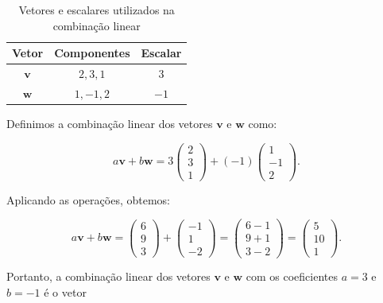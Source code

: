 \begin{table}[h]
	\centering
	\begin{tabular}{@{}ccc@{}}
		\toprule
		\textbf{Vetor} & \textbf{Componentes} & \textbf{Escalar} \\ \midrule
		$\mathbf{v}$   & $ 2, 3, 1$   & $3$              \\
		$\mathbf{w}$   & $ 1, -1, 2$  & $-1$             \\ \bottomrule
	\end{tabular}
	\caption{Vetores e escalares utilizados na combinação linear}
\end{table}

Definimos a combinação linear dos vetores $\mathbf{v}$ e $\mathbf{w}$ como:

\begin{equation}
	a\mathbf{v} + b\mathbf{w} = 3 \begin{pmatrix} 2 \\ 3 \\ 1 \end{pmatrix} + (-1) \begin{pmatrix} 1 \\ -1 \\ 2 \end{pmatrix}.
\end{equation}

Aplicando as operações, obtemos:

\begin{equation}
	a\mathbf{v} + b\mathbf{w} = \begin{pmatrix} 6 \\ 9 \\ 3 \end{pmatrix} + \begin{pmatrix} -1 \\ 1 \\ -2 \end{pmatrix} = \begin{pmatrix} 6 - 1 \\ 9 + 1 \\ 3 - 2 \end{pmatrix} = \begin{pmatrix} 5 \\ 10 \\ 1 \end{pmatrix}.
\end{equation}

Portanto, a combinação linear dos vetores $\mathbf{v}$ e $\mathbf{w}$ com os coeficientes $a = 3$ e $b = -1$ é o vetor 

